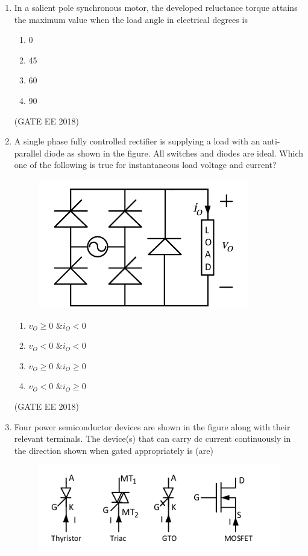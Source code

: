 \documentclass[journal,12pt,onecolumn]{IEEEtran}
\theoremstyle{remark}
\begin{document}
\begin{enumerate}
    \item In a salient pole synchronous motor, the developed reluctance torque attains the maximum value when the load angle in electrical degrees is
    \begin{multicols}{4}
    \begin{enumerate}
        \item 0
        \item 45
        \item 60
        \item 90
    \end{enumerate}
    \end{multicols}
\hfill{(GATE EE 2018)}
    \item A single phase fully controlled rectifier is supplying a load with an anti-parallel diode as shown in the figure. All switches and diodes are ideal. Which one of the following is true for instantaneous load voltage and current?
  \begin{figure}[H]
    \centering
    \includegraphics[]{figs/Q.3.png}
    \caption{}
    \label{fig:1}
\end{figure}
    \begin{enumerate}
        \item $v_{O} \geq 0 \text{ \& } i_{O} < 0$
        \item $v_{O} < 0 \text{ \& } i_{O} < 0$
        \item $v_{O} \geq 0 \text{ \& } i_{O} \geq 0$
        \item $v_{O} < 0 \text{ \& } i_{O} \geq 0$
    \end{enumerate}
\hfill{(GATE EE 2018)}
    \item Four power semiconductor devices are shown in the figure along with their relevant terminals. The device(s) that can carry dc current continuously in the direction shown when gated appropriately is (are)
    \begin{figure}[H]
    \centering
    \includegraphics[]{figs/Q.4.png}

\end{figure}
\end{enumerate}
\end{document}
